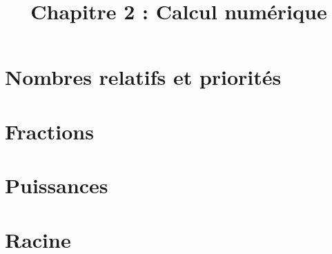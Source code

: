 \title{\vspace{-2em}Chapitre 2 : Calcul numérique\vspace{-3em}}%
\date{ }
\maketitle



\section{Nombres relatifs et priorités}



\section{Fractions}



\section{Puissances}



\section{Racine}

